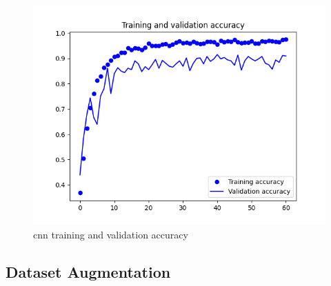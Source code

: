 \documentclass[10pt,twocolumn,letterpaper]{article}
\begin{document}
\begin{figure}[H]
  \centering
   \includegraphics[width=0.9\linewidth, trim={3em, 2em, 4em, 4em}, clip]{cnn_accuracy}
   \caption{\acrshort{cnn} training and validation accuracy}
   \label{fig:cnn_accuracy}
\end{figure}

\subsection{Dataset Augmentation}
\end{document}
